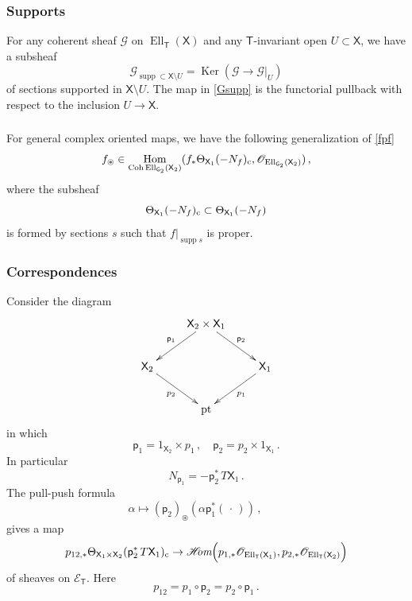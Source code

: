 \documentclass[14pt]{extarticle}
\newcommand{\bT}{\mathsf{T}}
\newcommand{\bG}{\mathsf{G}}
\newcommand{\bX}{\mathsf{X}}
\newcommand{\cG}{\mathscr{G}}
\newcommand{\cE}{\mathscr{E}}
\newcommand{\cH}{\mathscr{H}}
\newcommand{\cO}{\mathscr{O}}
\newcommand{\cHom}{\cH\!\!\textit{om}}
\newcommand{\cs}{_{\textup{c}}}
\newcommand{\ppf}{{\circledast}}
\newcommand{\pf}{_{\ppf}}
\newcommand{\forp}{\mathsf{p}}
\DeclareMathOperator{\Coh}{Coh}
\DeclareMathOperator{\Hom}{Hom}
\DeclareMathOperator{\Ker}{Ker}
\DeclareMathOperator{\Ell}{Ell}
\DeclareMathOperator{\pt}{pt}
\DeclareMathOperator{\supp}{supp}
\theoremstyle{definition}
\begin{document}
\subsubsection{Supports}

For any coherent sheaf $\cG$ on  $\Ell_\bT(\bX)$ and any
$\bT$-invariant open $U \subset \bX$, we have a subsheaf
%
\begin{equation}
  \label{Gsupp}
  \cG_{\supp \subset \bX \setminus U} = \Ker \left( \cG \to \cG|_{U}
  \right) 
\end{equation}
%
of sections supported in $\bX\setminus U$. The map in \eqref{Gsupp} is
the functorial pullback with respect to the inclusion $U \to \bX$.

\subsubsection{}
For general complex oriented maps, we have the following
generalization of \eqref{fpf}
%
\begin{equation}
f\pf \in \Hom_{\Coh \Ell_{\bG_2}(\bX_2)}
(f_* \Theta_{\bX_1}(-N_f)\cs,\cO_{\Ell_{\bG_2}(\bX_2)}) \label{fpf}
\,, 
\end{equation}
%
where the subsheaf
$$
\Theta_{\bX_1}(-N_f)\cs\subset \Theta_{\bX_1}(-N_f)
$$
is formed by sections $s$ such that $f\big|_{\supp s}$ is
proper.



\subsubsection{Correspondences}

Consider the diagram
%
\begin{equation}\label{diagcorr} 
  \xymatrix{&\bX_2 \times \bX_1 \ar[dl]_{\forp_1} \ar[dr]^{\forp_2} \\
    \bX_2 \ar[dr]_{p_2}&& \bX_1  \ar[dl]^{p_1}\\
    & \pt 
  }
\end{equation}
%
in which
$$
\forp_1 = 1_{\bX_2} \times p_1 \,, \quad \forp_2 = p_2 \times 1_{\bX_1} \,.
$$
In particular
$$
N_{\forp_1} = -  \forp_2^* \, T \bX_1\,.
$$
The pull-push formula
%
\begin{equation}
  \label{pullpush}
  \alpha \mapsto (\forp_2)\pf ( \alpha \forp_1^*(\, \cdot \,))  \,, \qquad
  \end{equation}
%
gives a map 
%
\begin{equation}
p_{12,*} \Theta_{\bX_1 \times \bX_2}(\forp_2^* \,  T\bX_1)\cs \to
\cHom\Big(
p_{1,*}  \cO_{\Ell_\bT(\bX_1)} , p_{2,*}  \cO_{\Ell_\bT(\bX_2)}
\Big)\label{pullpush2}
\end{equation}
%
of sheaves on
$\cE_\bT$. Here
$$
p_{12} = p_1 \circ \forp_2 = p_2 \circ \forp_1 \,.
$$
\end{document}
